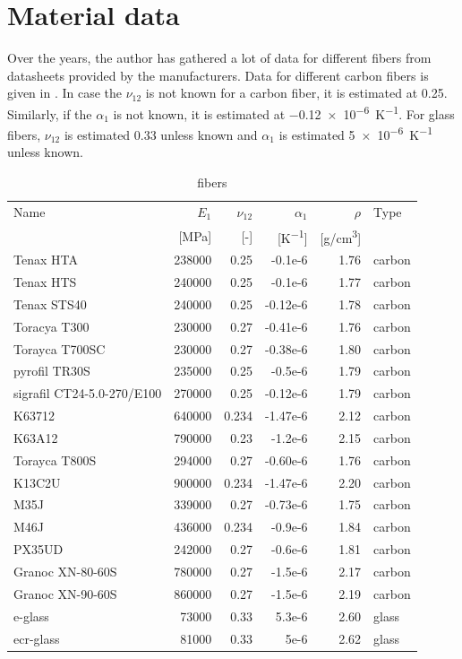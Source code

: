 \documentclass[a4paper,landscape,oneside,11pt,twocolumn]{memoir}
\begin{document}
\section{Material data} %

Over the years, the author has gathered a lot of data for different fibers
from datasheets provided by the manufacturers. Data for different carbon
fibers is given in . In case the $\nu_{12}$ is not
known for a carbon fiber, it is estimated at 0.25. Similarly, if the
$\alpha_1$ is not known, it is estimated at \SI{-0.12e-6}{K^{-1}}. For glass
fibers, $\nu_{12}$ is estimated 0.33 unless known and $\alpha_1$ is estimated
\SI{5e-6}{K^{-1}} unless known.

\begin{table}[!htbp]
  \centering
  \caption{\label{tb:fibers}fibers}
  \begin{tabular}{lrrrrl}%
      Name & $E_1$ & $\nu_{12}$ & $\alpha_1$ & $\rho$ & Type\\
      & [\si{MPa}] & [-] & [\si{K^{-1}}] & [\si{g/cm^3}]\\
    \midrule
      Tenax HTA & 238000 & 0.25 & -0.1e-6 & 1.76 & carbon\\
Tenax HTS & 240000 & 0.25 & -0.1e-6 & 1.77 & carbon\\
Tenax STS40 & 240000 & 0.25 & -0.12e-6 & 1.78 & carbon\\
Toracya T300 & 230000 & 0.27 & -0.41e-6 & 1.76 & carbon\\
Torayca T700SC & 230000 & 0.27 & -0.38e-6 & 1.80 & carbon\\
pyrofil TR30S & 235000 & 0.25 & -0.5e-6 & 1.79 & carbon\\
sigrafil CT24-5.0-270/E100 & 270000 & 0.25 & -0.12e-6 & 1.79 & carbon\\
K63712 & 640000 & 0.234 & -1.47e-6 & 2.12 & carbon\\
K63A12 & 790000 & 0.23 & -1.2e-6 & 2.15 & carbon\\
Torayca T800S & 294000 & 0.27 & -0.60e-6 & 1.76 & carbon\\
K13C2U & 900000 & 0.234 & -1.47e-6 & 2.20 & carbon\\
M35J & 339000 & 0.27 & -0.73e-6 & 1.75 & carbon\\
M46J & 436000 & 0.234 & -0.9e-6 & 1.84 & carbon\\
PX35UD & 242000 & 0.27 & -0.6e-6 & 1.81 & carbon\\
Granoc XN-80-60S & 780000 & 0.27 & -1.5e-6 & 2.17 & carbon\\
Granoc XN-90-60S & 860000 & 0.27 & -1.5e-6 & 2.19 & carbon\\
e-glass & 73000 & 0.33 & 5.3e-6 & 2.60 & glass\\
ecr-glass & 81000 & 0.33 & 5e-6 & 2.62 & glass\\
  \end{tabular}
\end{table}
\end{document}
